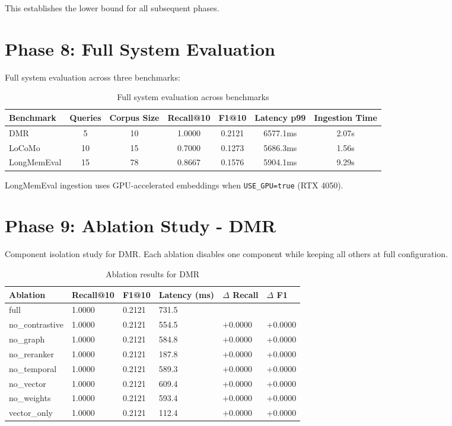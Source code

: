 \documentclass[11pt]{article}
\begin{document}
This establishes the lower bound for all subsequent phases.

\section{Phase 8: Full System Evaluation}
Full system evaluation across three benchmarks:

\begin{table}[htbp]
\centering
\begin{tabular}{lcccccc}
\toprule
Benchmark & Queries & Corpus Size & Recall@10 & F1@10 & Latency p99 & Ingestion Time \\
\midrule
DMR & 5 & 10 & 1.0000 & 0.2121 & 6577.1ms & 2.07s \\
LoCoMo & 10 & 15 & 0.7000 & 0.1273 & 5686.3ms & 1.56s \\
LongMemEval & 15 & 78 & 0.8667 & 0.1576 & 5904.1ms & 9.29s \\
\bottomrule
\end{tabular}
\caption{Full system evaluation across benchmarks}
\end{table}

LongMemEval ingestion uses GPU-accelerated embeddings when \texttt{USE\_GPU=true} (RTX 4050).

\section{Phase 9: Ablation Study - DMR}
Component isolation study for DMR. Each ablation disables one component while keeping all others at full configuration.

\begin{table}[htbp]
\centering
\begin{tabular}{llllll}
\toprule
Ablation & Recall@10 & F1@10 & Latency (ms) & $\Delta$ Recall & $\Delta$ F1 \\
\midrule
full & 1.0000 & 0.2121 & 731.5 &  &  \\
no\_contrastive & 1.0000 & 0.2121 & 554.5 & +0.0000 & +0.0000 \\
no\_graph & 1.0000 & 0.2121 & 584.8 & +0.0000 & +0.0000 \\
no\_reranker & 1.0000 & 0.2121 & 187.8 & +0.0000 & +0.0000 \\
no\_temporal & 1.0000 & 0.2121 & 589.3 & +0.0000 & +0.0000 \\
no\_vector & 1.0000 & 0.2121 & 609.4 & +0.0000 & +0.0000 \\
no\_weights & 1.0000 & 0.2121 & 593.4 & +0.0000 & +0.0000 \\
vector\_only & 1.0000 & 0.2121 & 112.4 & +0.0000 & +0.0000 \\
\bottomrule
\end{tabular}
\caption{Ablation results for DMR}
\end{table}
\end{document}
